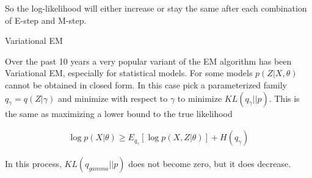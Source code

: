 \documentclass[11pt]{article}
\begin{document}
So the log-likelihood will either increase or stay the same after each combination of E-step and M-step.

Variational EM

Over the past 10 years a very popular variant of the EM algorithm has been Variational EM, especially for statistical models.  For some models $p(Z|X,\theta)$ cannot be obtained in closed form.  In this case pick a parameterized family $q_{\gamma}=q(Z|\gamma)$ and minimize with respect to $\gamma$ to minimize $KL(q_{\gamma}||p)$.  This is the same as maximizing a lower bound to the true likelihood

\begin{align*}
\log p(X|\theta) \geq E_{q_{\gamma}}[\log p(X,Z|\theta)] + H(q_{\gamma})
\end{align*}

In this process, $KL(q_{gamma}||p)$ does not become zero, but it does decrease.


%
%
\end{document}

